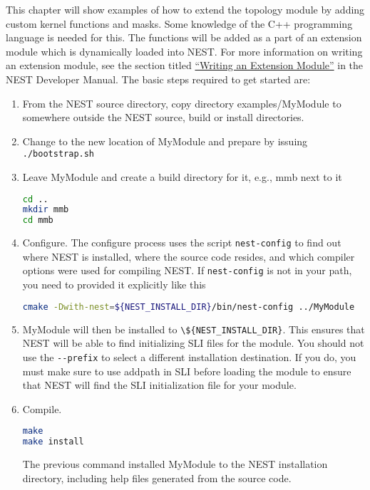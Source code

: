 \documentclass[a4paper,12pt]{report}
\begin{document}
This chapter will show examples of how to extend the topology module by
adding custom kernel functions and masks. Some knowledge of the C++
programming language is needed for this. The functions will be added as a
part of an extension module which is dynamically loaded into NEST. For more
information on writing an extension module, see the section titled
\href{http://nest.github.io/nest-simulator/extension_modules}{``Writing an Extension Module''}
in the NEST Developer Manual. The basic steps required to get started are:
\begin{enumerate}
\item From the NEST source directory, copy directory examples/MyModule to
  somewhere outside the NEST source, build or install directories.
\item Change to the new location of MyModule and prepare by issuing
  \lstinline!./bootstrap.sh!
\item Leave MyModule and create a build directory for it, e.g., mmb next to
  it
\begin{lstlisting}[language=bash]
cd ..
mkdir mmb
cd mmb
\end{lstlisting}
\item Configure. The configure process uses the script \lstinline!nest-config!
  to find out where NEST is installed, where the source code resides, and
  which compiler options were used for compiling NEST. If
  \lstinline!nest-config! is not in your path, you need to provided it
  explicitly like this
\begin{lstlisting}[language=bash]
cmake -Dwith-nest=${NEST_INSTALL_DIR}/bin/nest-config ../MyModule
\end{lstlisting}
\item MyModule will then be installed to \lstinline!\${NEST_INSTALL_DIR}!. This
  ensures that NEST will be able to find initializing SLI files for the
  module.  You should not use the \lstinline!--prefix! to select a different
  installation destination. If you do, you must make sure to use addpath in
  SLI before loading the module to ensure that NEST will find the SLI
  initialization file for your module.
\item Compile.
\begin{lstlisting}[language=bash]
make
make install
\end{lstlisting}
The previous command installed MyModule to the NEST installation directory, including help files generated from the source code.
\end{enumerate}
\end{document}
